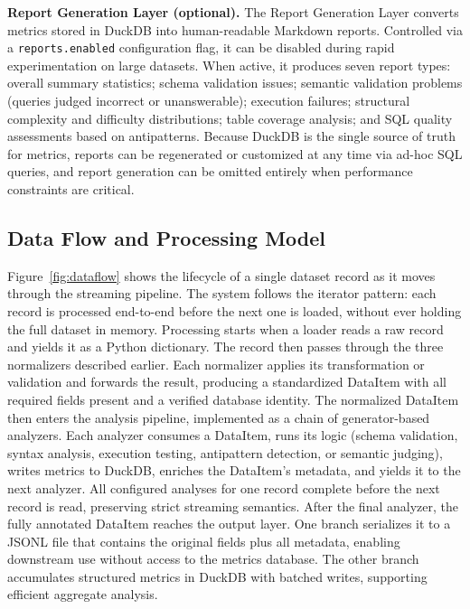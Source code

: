 \documentclass[print]{einformatica}
\begin{document}
\textbf{Report Generation Layer (optional).} The Report Generation Layer converts metrics stored in DuckDB into human-readable Markdown reports. Controlled via a \texttt{reports.enabled} configuration flag, it can be disabled during rapid experimentation on large datasets. When active, it produces seven report types: overall summary statistics; schema validation issues; semantic validation problems (queries judged incorrect or unanswerable); execution failures; structural complexity and difficulty distributions; table coverage analysis; and SQL quality assessments based on antipatterns. Because DuckDB is the single source of truth for metrics, reports can be regenerated or customized at any time via ad-hoc SQL queries, and report generation can be omitted entirely when performance constraints are critical.

\subsection{Data Flow and Processing Model}

Figure~\ref{fig:dataflow} shows the lifecycle of a single dataset record as it moves through the streaming pipeline. The system follows the iterator pattern: each record is processed end-to-end before the next one is loaded, without ever holding the full dataset in memory. Processing starts when a loader reads a raw record and yields it as a Python dictionary. The record then passes through the three normalizers described earlier. Each normalizer applies its transformation or validation and forwards the result, producing a standardized DataItem with all required fields present and a verified database identity. The normalized DataItem then enters the analysis pipeline, implemented as a chain of generator-based analyzers. Each analyzer consumes a DataItem, runs its logic (schema validation, syntax analysis, execution testing, antipattern detection, or semantic judging), writes metrics to DuckDB, enriches the DataItem's metadata, and yields it to the next analyzer. All configured analyses for one record complete before the next record is read, preserving strict streaming semantics. After the final analyzer, the fully annotated DataItem reaches the output layer. One branch serializes it to a JSONL file that contains the original fields plus all metadata, enabling downstream use without access to the metrics database. The other branch accumulates structured metrics in DuckDB with batched writes, supporting efficient aggregate analysis.
\end{document}

